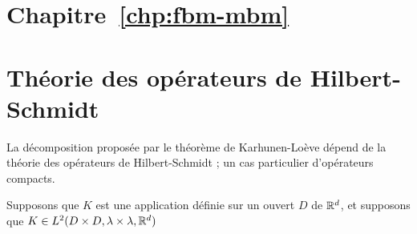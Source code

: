\section{Chapitre~\ref{chp:fbm-mbm}}

\section{Théorie des opérateurs de Hilbert-Schmidt}
\label{sec:hs-op}

La décomposition proposée par le théorème de Karhunen-Loève dépend de
la théorie des opérateurs de Hilbert-Schmidt ; un cas particulier
d'opérateurs compacts.

\begin{definition}
  Supposons que $K$ est une application définie sur un ouvert $D$ de $\mathbb{R}^d$, et supposons que $K\in L^2(D\times D, \lambda\times\lambda, \mathbb{R}^d)$
\end{definition}
